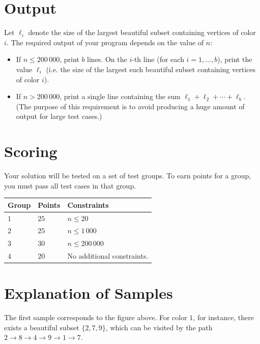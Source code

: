 \section*{Output}
Let $\ell_i$ denote the size of the largest beautiful subset containing vertices
of color $i$. The required output of your program depends on the value of $n$:
\begin{itemize}
  \item If $n \leq 200\,000$, print $b$ lines. On the $i$-th line (for each
        $i = 1, \ldots, b$), print the value $\ell_i$ (i.e. the size of the
        largest such beautiful subset containing vertices of color $i$).
  \item If $n > 200\,000$, print a single line containing the sum
        $\ell_1 + \ell_2 + \cdots + \ell_b$. (The purpose of this requirement is
        to avoid producing a huge amount of output for large test cases.)
\end{itemize}

\section*{Scoring}
Your solution will be tested on a set of test groups.
To earn points for a group, you must pass all test cases in that group.

\noindent
\begin{tabular}{| l | l | p{12cm} |}
  \hline
  \textbf{Group} & \textbf{Points} & \textbf{Constraints} \\ \hline
  $1$ & $25$ & $n \leq 20$ \\ \hline
  $2$ & $25$ & $n \leq 1\,000$ \\ \hline
  $3$ & $30$ & $n \leq 200\,000$ \\ \hline
  $4$ & $20$ & No additional constraints. \\ \hline
\end{tabular}

\section*{Explanation of Samples}
The first sample corresponds to the figure above. For color $1$, for instance,
there exists a beautiful subset $\{2, 7, 9\}$, which can be visited by the path
$2 \rightarrow 8 \rightarrow 4 \rightarrow 9 \rightarrow 1 \rightarrow 7$.
